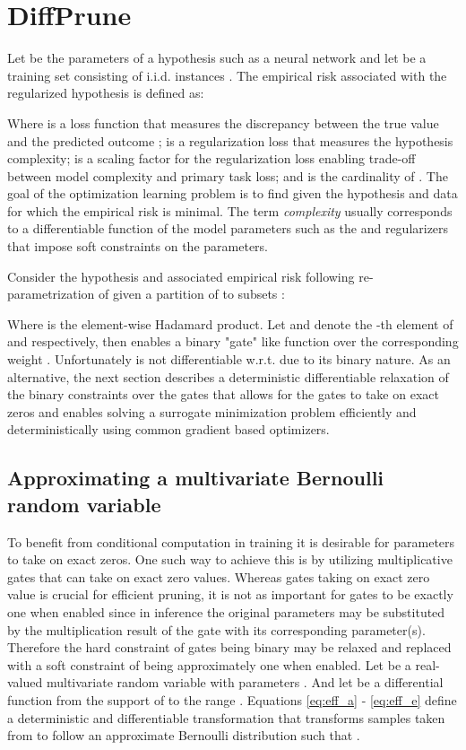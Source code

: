 \documentclass[final,1p,times]{elsarticle}
\begin{document}
\section{DiffPrune}
\label{S:DiffPrune}
Let  be the parameters of a hypothesis  such as a neural network and let  be a training set consisting of  i.i.d. instances . The empirical risk  associated with the regularized hypothesis  is defined as:



Where  is a loss function that measures the discrepancy between the true value  and the predicted outcome ;  is a regularization loss that measures the hypothesis complexity;  is a scaling factor for the regularization loss enabling trade-off between model complexity and primary task loss; and  is the cardinality of . The goal of the optimization learning problem is to find  given the hypothesis  and data  for which the empirical risk  is minimal. The term \textit{complexity} usually corresponds to a differentiable function of the model parameters such as the  and  regularizers that impose soft constraints on the parameters.

Consider the hypothesis  and associated empirical risk  following re-parametrization of  given a partition of  to  subsets :



Where  is the element-wise Hadamard product. Let  and  denote the -th element of  and  respectively, then  enables a binary "gate" like function over the corresponding weight . Unfortunately  is not differentiable w.r.t.  due to its binary nature. As an alternative, the next section describes a deterministic differentiable relaxation of the binary constraints over the gates that allows for the gates to take on exact zeros and enables solving a surrogate minimization problem efficiently and deterministically using common gradient based optimizers.

\subsection{Approximating a multivariate Bernoulli random variable}
To benefit from conditional computation in training it is desirable for parameters to take on exact zeros. One such way to achieve this is by utilizing multiplicative gates that can take on exact zero values. Whereas gates taking on exact zero value is crucial for efficient pruning, it is not as important for gates to be exactly one when enabled since in inference the original parameters may be substituted by the multiplication result of the gate with its corresponding parameter(s). Therefore the hard constraint of gates being binary may be relaxed and replaced with a soft constraint of being approximately one when enabled. Let  be a real-valued multivariate random variable with parameters . And let  be a differential function from the support of  to the range . Equations \eqref{eq:eff_a} - \eqref{eq:eff_e} define a deterministic and differentiable transformation  that transforms samples taken from  to follow an approximate Bernoulli distribution such that .
\end{document}
